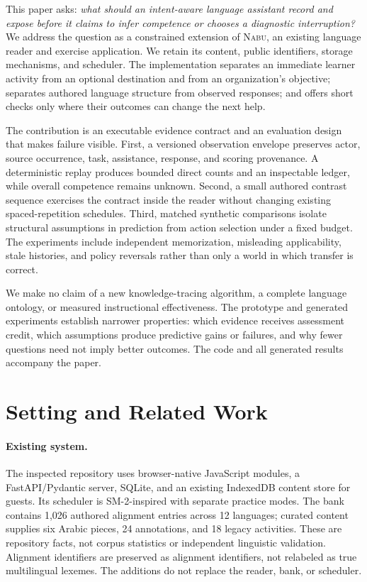 \documentclass{article}
\newcommand{\Nabu}{\textsc{Nabu}}
\begin{document}
This paper asks: \emph{what should an intent-aware language assistant record and expose before it claims to infer competence or chooses a diagnostic interruption?} We address the question as a constrained extension of \Nabu{}, an existing language reader and exercise application. We retain its content, public identifiers, storage mechanisms, and scheduler. The implementation separates an immediate learner activity from an optional destination and from an organization's objective; separates authored language structure from observed responses; and offers short checks only where their outcomes can change the next help.

The contribution is an executable evidence contract and an evaluation design that makes failure visible. First, a versioned observation envelope preserves actor, source occurrence, task, assistance, response, and scoring provenance. A deterministic replay produces bounded direct counts and an inspectable ledger, while overall competence remains unknown. Second, a small authored contrast sequence exercises the contract inside the reader without changing existing spaced-repetition schedules. Third, matched synthetic comparisons isolate structural assumptions in prediction from action selection under a fixed budget. The experiments include independent memorization, misleading applicability, stale histories, and policy reversals rather than only a world in which transfer is correct.

We make no claim of a new knowledge-tracing algorithm, a complete language ontology, or measured instructional effectiveness. The prototype and generated experiments establish narrower properties: which evidence receives assessment credit, which assumptions produce predictive gains or failures, and why fewer questions need not imply better outcomes. The code and all generated results accompany the paper.

\section{Setting and Related Work}
\label{sec:setting}

\paragraph{Existing system.}
The inspected repository uses browser-native JavaScript modules, a FastAPI/Pydantic server, SQLite, and an existing IndexedDB content store for guests. Its scheduler is SM-2-inspired with separate practice modes. The bank contains 1,026 authored alignment entries across 12 languages; curated content supplies six Arabic pieces, 24 annotations, and 18 legacy activities. These are repository facts, not corpus statistics or independent linguistic validation. Alignment identifiers are preserved as alignment identifiers, not relabeled as true multilingual lexemes. The additions do not replace the reader, bank, or scheduler.
\end{document}
